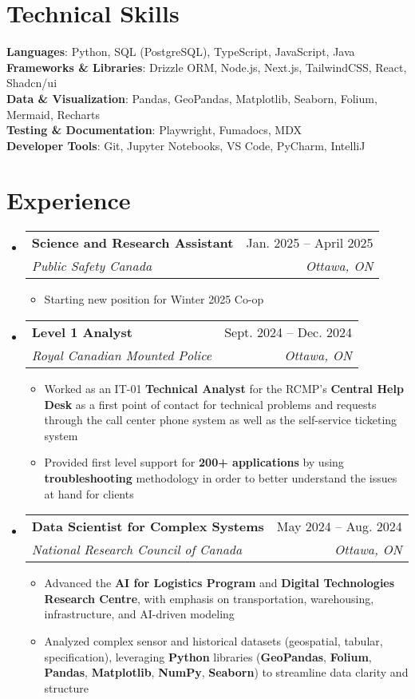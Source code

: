 \documentclass[letterpaper,11pt]{article}
\makeatletter
\newcommand{\resumeItem}[1]{
  \item\small{
    {#1 \vspace{-2pt}}
  }
}
\newcommand{\resumeSubheading}[4]{
  \vspace{-2pt}\item
    \begin{tabular*}{0.97\textwidth}[t]{l@{\extracolsep{\fill}}r}
      \textbf{#1} & #2 \\
      \textit{\small#3} & \textit{\small #4} \\
    \end{tabular*}\vspace{-7pt}
}
\newcommand{\resumeSubHeadingListStart}{\begin{itemize}[leftmargin=0.15in, label={}]}
\newcommand{\resumeSubHeadingListEnd}{\end{itemize}}
\newcommand{\resumeItemListStart}{\begin{itemize}}
\newcommand{\resumeItemListEnd}{\end{itemize}\vspace{-5pt}}
\makeatother
\begin{document}
\section{Technical Skills}
 \begin{itemize}[leftmargin=0.15in, label={}]
    \small{\item{
    \textbf{Languages}{: Python, SQL (PostgreSQL), TypeScript, JavaScript, Java} \\
     \textbf{Frameworks \& Libraries}{: Drizzle ORM, Node.js, Next.js, TailwindCSS, React, Shadcn/ui} \\
     \textbf{Data \& Visualization}{: Pandas, GeoPandas, Matplotlib, Seaborn, Folium, Mermaid, Recharts} \\
     \textbf{Testing \& Documentation}{: Playwright, Fumadocs, MDX} \\
     \textbf{Developer Tools}{: Git, Jupyter Notebooks, VS Code, PyCharm, IntelliJ} \\
    }}
 \end{itemize}

\section{Experience}
  \resumeSubHeadingListStart
  
    \resumeSubheading
      {Science and Research Assistant}{Jan. 2025 -- April 2025}
      {Public Safety Canada}{Ottawa, ON}
      \resumeItemListStart
    
  \resumeItem{Starting new position for Winter 2025 Co-op}
       
      \resumeItemListEnd

    \resumeSubheading
      {Level 1 Analyst}{Sept. 2024 -- Dec. 2024}
      {Royal Canadian Mounted Police}{Ottawa, ON}
      \resumeItemListStart
       \resumeItem{Worked as an IT-01 \textbf{Technical Analyst} for the RCMP's \textbf{Central Help Desk} as a first point of contact for technical problems and requests through the call center phone system as well as the self-service ticketing system}
       \resumeItem{Provided first level support for \textbf{200+ applications} by using \textbf{troubleshooting} methodology in order to better understand the issues at hand for clients}
       \resumeItemListEnd
    \resumeSubheading
      {Data Scientist for Complex Systems}{May 2024 -- Aug. 2024}
      {National Research Council of Canada}{Ottawa, ON}
      \resumeItemListStart
         \resumeItem{Advanced the \textbf{AI for Logistics Program} and \textbf{Digital Technologies Research Centre}, with emphasis on transportation, warehousing, infrastructure, and AI-driven modeling}
    \resumeItem{Analyzed complex sensor and historical datasets (geospatial, tabular, specification), leveraging \textbf{Python} libraries (\textbf{GeoPandas}, \textbf{Folium}, \textbf{Pandas}, \textbf{Matplotlib}, \textbf{NumPy}, \textbf{Seaborn}) to streamline data clarity and structure}
  \resumeItemListEnd
  \resumeSubHeadingListEnd
\end{document}
